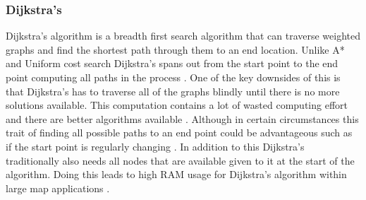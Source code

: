 \subsubsection{Dijkstra's}
Dijkstra’s algorithm is a breadth first search algorithm that can traverse weighted graphs and find the shortest path through them to an end location. Unlike A* and Uniform cost search Dijkstra’s spans out from the start point to the end point computing all paths in the process \citetemp. One of the key downsides of this is that Dijkstra’s has to traverse all of the graphs blindly until there is no more solutions available. This computation contains a lot of wasted computing effort and there are better algorithms available \citetemp. Although in certain circumstances this trait of finding all possible paths to an end point could be advantageous such as if the start point is regularly changing \citetemp.
In addition to this Dijkstra’s traditionally also needs all nodes that are available given to it at the start of the algorithm. Doing this leads to high RAM usage for Dijkstra’s algorithm within large map applications \citetemp. 
